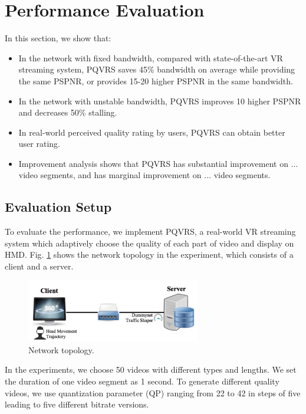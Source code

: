 \section{Performance Evaluation}

In this section, we show that:

\begin{itemize}

\item In the network with fixed bandwidth, compared with state-of-the-art VR streaming system, PQVRS saves 45\% bandwidth on average while providing the same PSPNR, or provides 15-20 higher PSPNR in the same bandwidth.

\item In the network with unstable bandwidth, PQVRS improves 10 higher PSPNR and decreases 50\% stalling.

\item In real-world perceived quality rating by users, PQVRS can obtain better user rating.

\item Improvement analysis shows that PQVRS has substantial improvement on ... video segments, and has marginal improvement on ... video segments.

\end{itemize}

\subsection{Evaluation Setup}

To evaluate the performance, we implement PQVRS, a real-world VR streaming system which adaptively choose the quality of each part of video and display on HMD. Fig. \ref{network} shows the network topology in the experiment, which consists of a client and a server.

\begin{figure}
  \centering
  \includegraphics[width=3in]{images/network.jpg}
  \caption{Network topology.}
  \label{network}
  \end{figure}

In the experiments, we choose 50 videos with different types and lengths. We set the duration of one video segment as 1 second. To generate different quality videos, we use quantization parameter (QP) ranging from 22 to 42 in steps of five leading to five different bitrate versions. 

